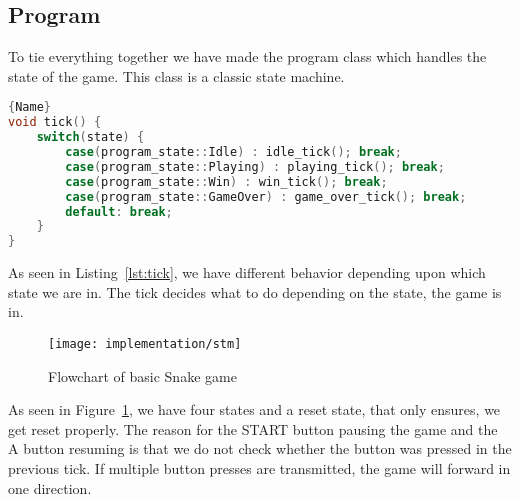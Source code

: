 \subsection{Program}
To tie everything together we have made the program class which handles the state of the game. This class is a classic state machine.

\begin{lstlisting}[caption={A tick of the game},label={lst:tick},frame=tlrb, language=C++]{Name}
void tick() {
	switch(state) {
		case(program_state::Idle) : idle_tick(); break;
		case(program_state::Playing) : playing_tick(); break;
		case(program_state::Win) : win_tick(); break;
		case(program_state::GameOver) : game_over_tick(); break;
		default: break;
	}
}
\end{lstlisting}

As seen in Listing~\ref{lst:tick}, we have different behavior depending upon which state we are in. The tick decides what to do depending on the state, the game is in. 

\begin{figure}
\centering
\texttt{[image: implementation/stm]}
\caption{Flowchart of basic Snake game}
\label{fig:flow}
\end{figure}

As seen in Figure~\ref{fig:flow}, we have four states and a reset state, that only ensures, we get reset properly. The reason for the START button pausing the game and the A button resuming is that we do not check whether the button was pressed in the previous tick.  If multiple button presses are transmitted, the game will forward in one direction.

